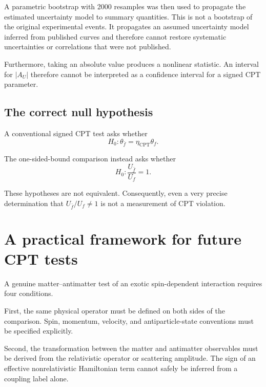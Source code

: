 \documentclass[aps,prd,reprint,superscriptaddress,nofootinbib]{revtex4-2}
\newcommand{\CPT}{\mathrm{CPT}}
\begin{document}
	A parametric bootstrap with 2000 resamples was then used to propagate
	the estimated uncertainty model to summary quantities. This is not a
	bootstrap of the original experimental events. It propagates an
	assumed uncertainty model inferred from published curves and therefore
	cannot restore systematic uncertainties or correlations that were not
	published.
	
	Furthermore, taking an absolute value produces a nonlinear statistic.
	An interval for $|A_U|$ therefore cannot be interpreted as a confidence
	interval for a signed CPT parameter.
	
	\subsection{The correct null hypothesis}
	
	A conventional signed CPT test asks whether
	\begin{equation}
		H_0:
		\theta_{\bar f}=\eta_\CPT\theta_f.
		\label{eq:nullCPT}
	\end{equation}
	
	The one-sided-bound comparison instead asks whether
	\begin{equation}
		H_0:
		\frac{U_{\bar f}}{U_f}=1.
		\label{eq:nullsens}
	\end{equation}
	
	These hypotheses are not equivalent. Consequently, even a very precise
	determination that $U_{\bar f}/U_f\neq1$ is not a measurement of
	CPT violation.
	
	\section{A practical framework for future CPT tests}
	
	A genuine matter--antimatter test of an exotic spin-dependent
	interaction requires four conditions.
	
	First, the same physical operator must be defined on both sides of the
	comparison. Spin, momentum, velocity, and antiparticle-state
	conventions must be specified explicitly.
	
	Second, the transformation between the matter and antimatter
	observables must be derived from the relativistic operator or
	scattering amplitude. The sign of an effective nonrelativistic
	Hamiltonian term cannot safely be inferred from a coupling label alone.
	
\end{document}
